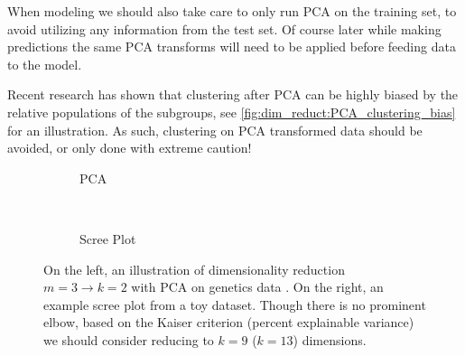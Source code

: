 When modeling we should also take care to only run PCA on the training set,
to avoid utilizing any information from the test set.
Of course later while making predictions the same PCA transforms
will need to be applied before feeding data to the model.

Recent research \cite{Elhaik_2022} has shown that clustering after PCA
can be highly biased by the relative populations of the subgroups,
see \cref{fig:dim_reduct:PCA_clustering_bias} for an illustration.
As such, clustering on PCA transformed data should be avoided,
or only done with extreme caution!

\begin{figure}[H]
  \centering

  \begin{subfigure}[b]{0.48\textwidth}\centering
    \usebox{\largestimage}
    \vspace{0.01cm}
  \caption{PCA}
  \label{fig:dim_reduct:PCA:illustration}
  \end{subfigure}
  ~
  \begin{subfigure}[b]{\wd\largestimage}\centering
  \caption{Scree Plot}
  \label{fig:dim_reduct:PCA:scree}
  \end{subfigure}
\caption{
On the left, an illustration of dimensionality reduction $m=3 \to k=2$ with PCA on genetics data \cite{Scholz2006}.
On the right, an example scree plot from a toy dataset.
Though there is no prominent elbow,
based on the Kaiser criterion (percent explainable variance)
we should consider reducing to $k=9$ ($k=13$) dimensions.
\label{fig:dim_reduct:PCA}
}
\end{figure}

